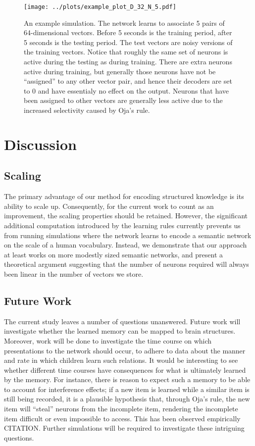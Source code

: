 \documentclass[10pt,letterpaper]{article}
\begin{document}
\begin{figure}[ht]
\begin{center}
\texttt{[image: ../plots/example\_plot\_D\_32\_N\_5.pdf]}
\end{center}
\caption{An example simulation. The network learns to associate 5 pairs of 64-dimensional vectors. Before 5 seconds is the training period, after 5 seconds is the testing period. The test vectors are noisy versions of the training vectors. Notice that roughly the same set of neurons is active during the testing as during training. There are extra neurons active during training, but generally those neurons have not be ``assigned'' to any other vector pair, and hence their decoders are set to 0 and have essentialy no effect on the output. Neurons that have been assigned to other vectors are generally less active due to the increased selectivity caused by Oja's rule.}
\label{fig:example}
\end{figure}

\section{Discussion}

\subsection{Scaling}
The primary advantage of our method for encoding structured knowledge is its ability to scale up. Consequently, for the current work to count as an improvement, the scaling properties should be retained. However, the significant additional computation introduced by the learning rules currently prevents us from running simulations where the network learns to encode a semantic network on the scale of a human vocabulary. Instead, we demonstrate that our approach at least works on more modestly sized semantic networks, and present a theoretical argument suggesting that the number of neurons required will always been linear in the number of vectors we store. 

\subsection{Future Work}
The current study leaves a number of questions unanswered. Future work will investigate whether the learned memory can be mapped to brain structures. Moreover, work will be done to investigate the time course on which presentations to the network should occur, to adhere to data about the manner and rate in which children learn such relations. It would be interesting to see whether different time courses have consequences for what is ultimately learned by the memory. For instance, there is reason to expect such a memory to be able to account for interference effects; if a new item is learned while a similar item is still being recorded, it is a plausible hypothesis that, through Oja's rule, the new item will ``steal'' neurons from the incomplete item, rendering the incomplete item difficult or even impossible to access. This has been observed empirically CITATION. Further simulations will be required to investigate these intriguing questions.
\end{document}
